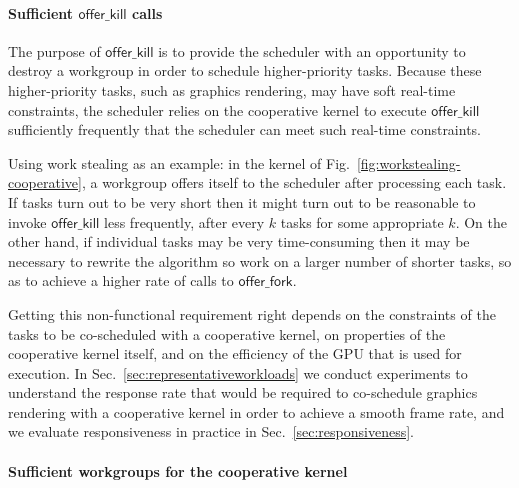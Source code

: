 \documentclass[numbers,nocopyrightspace,10pt]{sigplanconf}
\newcommand{\myfig}{Fig.~}
\newcommand{\mysec}{Sec.~}
\newcommand{\offerfork}{\mathsf{offer\_fork}}
\newcommand{\offerkill}{\mathsf{offer\_kill}}
\begin{document}
\paragraph{Sufficient $\offerkill$ calls}

The purpose of $\offerkill$ is to provide the scheduler with an
opportunity to destroy a workgroup in order to schedule
higher-priority tasks.  Because these higher-priority tasks, such as
graphics rendering, may have soft real-time constraints, the scheduler
relies on the cooperative kernel to execute $\offerkill$ sufficiently
frequently that the scheduler can meet such real-time constraints.

Using work stealing as an example: in the kernel of \myfig\ref{fig:workstealing-cooperative}, a
workgroup offers itself to the scheduler after processing each task.
If tasks turn out to be very short then it might turn out to be
reasonable to invoke $\offerkill$ less frequently, after every $k$
tasks for some appropriate $k$.  On the other hand, if individual
tasks may be very time-consuming then it may be necessary to rewrite
the algorithm so work on a larger number of shorter tasks, so as to
achieve a higher rate of calls to $\offerfork$.

Getting this non-functional requirement right depends on the
constraints of the tasks to be co-scheduled with a cooperative kernel,
on properties of the cooperative kernel itself, and on the efficiency
of the GPU that is used for execution.  In \mysec\ref{sec:representativeworkloads} we conduct
experiments to understand the response rate that would be required to
co-schedule graphics rendering with a cooperative kernel in order to
achieve a smooth frame rate, and we evaluate responsiveness in
practice in \mysec\ref{sec:responsiveness}.

\paragraph{Sufficient workgroups for the cooperative kernel}
\end{document}
